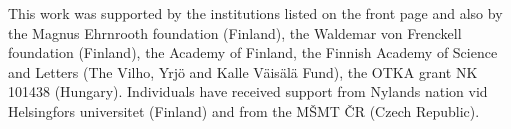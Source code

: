 
This work was supported by the institutions listed on the front page and also by the 
Magnus Ehrnrooth foundation (Finland), the Waldemar von Frenckell foundation (Finland), 
the Academy of Finland, the Finnish Academy of Science and Letters (The Vilho, Yrj\"o and Kalle V\"ais\"al\"a Fund), 
the OTKA grant NK 101438 (Hungary). Individuals have received support from Nylands nation vid Helsingfors universitet (Finland) 
and from the M\v SMT \v CR (Czech Republic).
